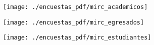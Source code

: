 \begin{figure}[!ht]
    \centering
    \texttt{[image: ./encuestas\_pdf/mirc\_academicos]}
\end{figure}
\clearpage

\begin{figure}[!ht]
    \centering
    \texttt{[image: ./encuestas\_pdf/mirc\_egresados]}
\end{figure}
\clearpage

\begin{figure}[!ht]
    \centering
    \texttt{[image: ./encuestas\_pdf/mirc\_estudiantes]}
\end{figure}
\clearpage
